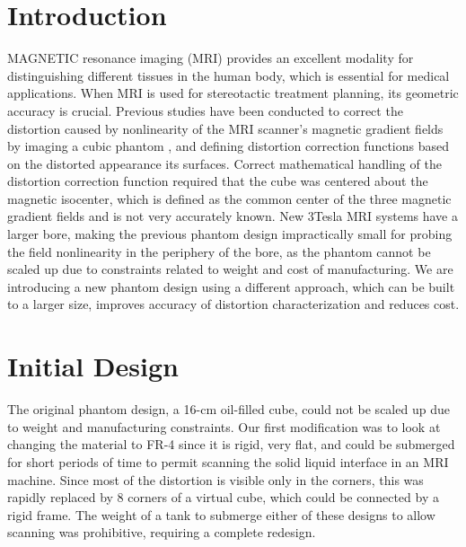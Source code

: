 \section{Introduction}

MAGNETIC resonance imaging (MRI) provides an excellent modality for distinguishing different tissues in the 
human body, which is essential for medical applications. When MRI is used for stereotactic treatment planning,
its geometric accuracy is crucial. Previous studies have been conducted to correct the distortion caused by 
nonlinearity of the MRI scanner’s magnetic gradient fields by imaging a cubic phantom \cite{simple_approach},
\cite{tlee_iaeng} and defining 
distortion correction functions based on the distorted appearance its surfaces. Correct mathematical handling 
of the distortion correction function required that the cube was centered about the magnetic isocenter, which 
is defined as the common center of the three magnetic gradient fields and  is not very accurately known.  
New 3Tesla MRI systems have a larger bore, making the previous phantom design impractically small for probing 
the field nonlinearity in the periphery of the bore, as the phantom cannot be scaled up due to constraints 
related to weight and cost of manufacturing. We are introducing a new phantom design using a different 
approach, which can be built to a larger size, improves accuracy of distortion characterization and reduces 
cost.

\section{Initial Design}

The original phantom design, a 16-cm oil-filled cube, could not be scaled up due to weight and manufacturing 
constraints. Our first modification was to look at changing the material to FR-4 since it is rigid, very flat,
and could be submerged for short periods of time to permit scanning the solid liquid interface in an MRI 
machine.  Since most of the distortion is visible only in the corners, this was rapidly replaced by 8 corners 
of a virtual cube, which could be connected by a rigid frame.  The weight of a tank to submerge either of 
these designs to allow scanning was prohibitive, requiring a complete redesign.

